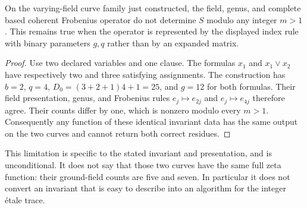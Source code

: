 \begin{proposition}\label{prop:ff-coherent-limit}
On the varying-field curve family just constructed, the field, genus, and complete based coherent Frobenius operator do not determine $S$ modulo any integer $m>1$. This remains true when the operator is represented by the displayed index rule with binary parameters $g,q$ rather than by an expanded matrix.
\end{proposition}
\begin{proof}
Use two declared variables and one clause. The formulas $x_1$ and $x_1\vee x_2$ have respectively two and three satisfying assignments. The construction has $b=2$, $q=4$, $D_0=(3+2+1)4+1=25$, and $g=12$ for both formulas. Their field presentation, genus, and Frobenius rules $e_j\mapsto e_{2j}$ and $e_j\mapsto e_{4j}$ therefore agree. Their counts differ by one, which is nonzero modulo every $m>1$. Consequently any function of these identical invariant data has the same output on the two curves and cannot return both correct residues.
\end{proof}

This limitation is specific to the stated invariant and presentation, and is unconditional. It does not say that those two curves have the same full zeta function: their ground-field counts are five and seven. In particular it does not convert an invariant that is easy to describe into an algorithm for the integer \'etale trace.
